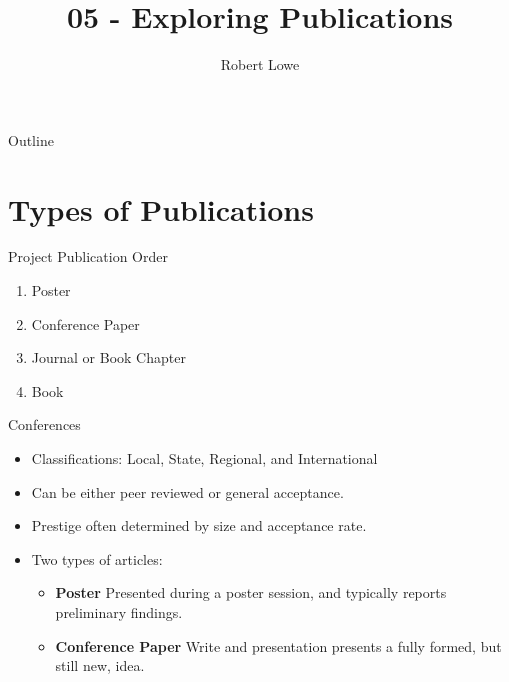 \documentclass[handout]{beamer}
\title{05 - Exploring Publications}
\author{Robert Lowe}
\institute[Southeast Missouri State University] %
{
  Department of Computer Science\\
  Southeast Missouri State University
}
\date[]{}
\begin{document}
\begin{frame}
  \titlepage
\end{frame}

\begin{frame}{Outline}
  \tableofcontents
\end{frame}





\section{Types of Publications}

\begin{frame}{Project Publication Order}
    \begin{enumerate}
        \item Poster
        \item Conference Paper
        \item Journal or Book Chapter
        \item Book
    \end{enumerate}
\end{frame}

\begin{frame}{Conferences}
    \begin{itemize}
        \item Classifications: Local, State, Regional, and International
        \item Can be either peer reviewed or general acceptance.
        \item Prestige often determined by size and acceptance rate.
        \item Two types of articles:
        \begin{itemize}
            \item \textbf{Poster} Presented during a poster session, and typically reports preliminary findings.
            \item \textbf{Conference Paper} Write and presentation presents a fully formed, but still new, idea.
        \end{itemize}
    \end{itemize}
\end{frame}
\end{document}

